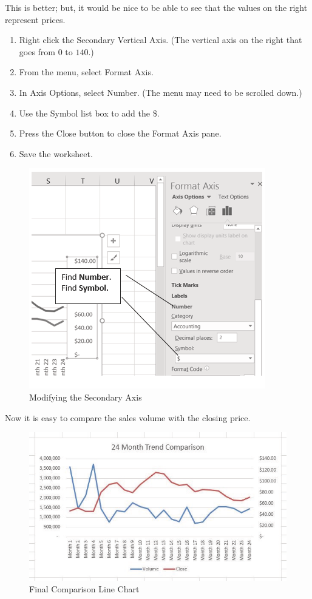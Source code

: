 This is better; but, it would be nice to be able to see that the values on the right represent prices.

\begin{enumerate}
	\item Right click the Secondary Vertical Axis. (The vertical axis on the right that goes from $ 0 $ to $ 140 $.)
	\item From the menu, select Format Axis.
	\item In Axis Options, select Number. (The menu may need to be scrolled down.)
	\item Use the Symbol list box to add the \$.
	\item Press the Close button to close the Format Axis pane.
	\item Save the worksheet.
\end{enumerate}

\begin{figure}[H]
	\centering
	\includegraphics[width=\maxwidth{.95\linewidth}]{gfx/ch04_fig09}
	\caption{Modifying the Secondary Axis}
	\label{04:fig09}
\end{figure}

Now it is easy to compare the sales volume with the closing price.

\begin{figure}[H]
	\centering
	\includegraphics[width=\maxwidth{.95\linewidth}]{gfx/ch04_fig10}
	\caption{Final Comparison Line Chart}
	\label{04:fig10}
\end{figure}

